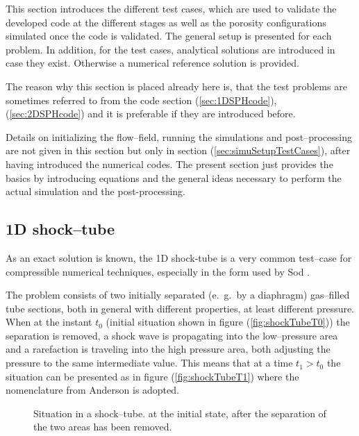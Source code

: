\documentclass{report}
\begin{document}
This section introduces the different test cases, which are used to validate the developed code at the different stages as well as the porosity configurations simulated once the code is validated. The general setup is presented for each problem. In addition, for the test cases,  analytical solutions are introduced in case they exist. Otherwise a numerical reference solution is provided.

The reason why this section is placed already here is, that the test problems are sometimes referred to from the code section (\ref{sec:1DSPHcode}),(\ref{sec:2DSPHcode}) and it is preferable if they are introduced before.

Details on initializing the flow--field, running the simulations and post--processing are not given in this section but only in section (\ref{sec:simuSetupTestCases}), after having introduced the numerical codes. The present section just provides the basics by introducing equations and the general ideas necessary to perform the actual simulation and the post-processing.

\subsection{1D shock--tube}
\label{sec:TestCases_1DshockTube}
As an exact solution is known, the 1D shock-tube is a very common test--case for compressible numerical techniques, especially in the form used by Sod \cite{Sod1978}.

 The problem consists of two initially separated (e.\ g.\ by a diaphragm) gas--filled tube sections, both in general with different properties, at least different pressure. When at the instant $t_0$ (initial situation shown in figure (\ref{fig:shockTubeT0})) the separation is removed, a shock wave is propagating into the low--pressure area and a rarefaction is traveling into the high pressure area, both adjusting the pressure to the same intermediate value. This means that at a time $t_1>t_0$ the situation can be presented as in figure (\ref{fig:shockTubeT1}) where the nomenclature from Anderson \cite{Anderson2002} is adopted.

\begin{figure}[h]
    \centering
\label{fig:shockTube}
\caption[Schematic of a shock--tube problem]{Situation in a shock--tube.  at the initial state,  after the separation of the two areas has been removed.}
\end{figure}
\end{document}

